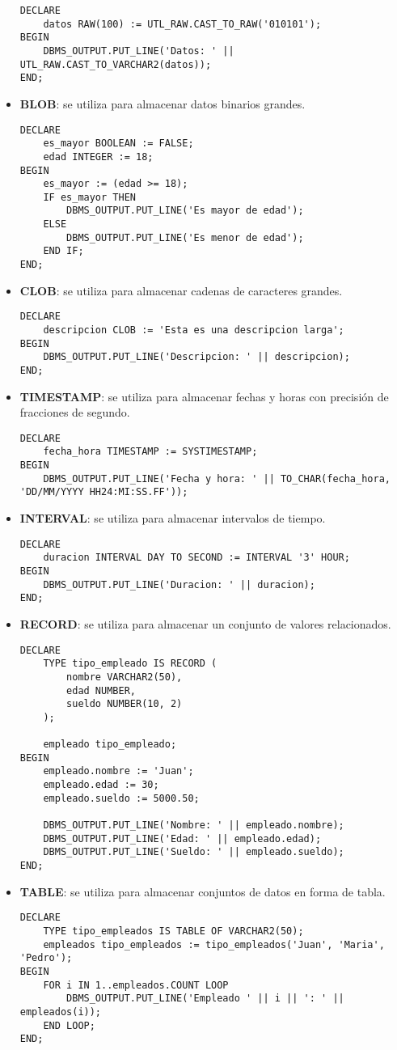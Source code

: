 \documentclass[executivepaper]{article}
\begin{document}
\begin{itemize}
\begin{lstlisting}
DECLARE
    datos RAW(100) := UTL_RAW.CAST_TO_RAW('010101');
BEGIN
    DBMS_OUTPUT.PUT_LINE('Datos: ' || UTL_RAW.CAST_TO_VARCHAR2(datos));
END;    
\end{lstlisting}
    \item \textbf{BLOB}: se utiliza para almacenar datos binarios grandes.
\begin{lstlisting}
DECLARE
    es_mayor BOOLEAN := FALSE;
    edad INTEGER := 18;
BEGIN
    es_mayor := (edad >= 18);
    IF es_mayor THEN
        DBMS_OUTPUT.PUT_LINE('Es mayor de edad');
    ELSE
        DBMS_OUTPUT.PUT_LINE('Es menor de edad');
    END IF;
END;
\end{lstlisting}
    \item \textbf{CLOB}: se utiliza para almacenar cadenas de caracteres grandes.
\begin{lstlisting}
DECLARE
    descripcion CLOB := 'Esta es una descripcion larga';
BEGIN
    DBMS_OUTPUT.PUT_LINE('Descripcion: ' || descripcion);
END;
\end{lstlisting}
    \item \textbf{TIMESTAMP}: se utiliza para almacenar fechas y horas con precisión de fracciones de segundo.
\begin{lstlisting}
DECLARE
    fecha_hora TIMESTAMP := SYSTIMESTAMP;
BEGIN
    DBMS_OUTPUT.PUT_LINE('Fecha y hora: ' || TO_CHAR(fecha_hora, 'DD/MM/YYYY HH24:MI:SS.FF'));
\end{lstlisting}
    \item \textbf{INTERVAL}: se utiliza para almacenar intervalos de tiempo.
\begin{lstlisting}
DECLARE
    duracion INTERVAL DAY TO SECOND := INTERVAL '3' HOUR;
BEGIN
    DBMS_OUTPUT.PUT_LINE('Duracion: ' || duracion);
END;
\end{lstlisting}
    \item \textbf{RECORD}: se utiliza para almacenar un conjunto de valores relacionados.
\begin{lstlisting}
DECLARE
    TYPE tipo_empleado IS RECORD (
        nombre VARCHAR2(50),
        edad NUMBER,
        sueldo NUMBER(10, 2)
    );

    empleado tipo_empleado;
BEGIN
    empleado.nombre := 'Juan';
    empleado.edad := 30;
    empleado.sueldo := 5000.50;

    DBMS_OUTPUT.PUT_LINE('Nombre: ' || empleado.nombre);
    DBMS_OUTPUT.PUT_LINE('Edad: ' || empleado.edad);
    DBMS_OUTPUT.PUT_LINE('Sueldo: ' || empleado.sueldo);
END;
\end{lstlisting}
    \item \textbf{TABLE}: se utiliza para almacenar conjuntos de datos en forma de tabla.
\begin{lstlisting}
DECLARE
    TYPE tipo_empleados IS TABLE OF VARCHAR2(50);
    empleados tipo_empleados := tipo_empleados('Juan', 'Maria', 'Pedro');
BEGIN
    FOR i IN 1..empleados.COUNT LOOP
        DBMS_OUTPUT.PUT_LINE('Empleado ' || i || ': ' || empleados(i));
    END LOOP;
END;
\end{lstlisting}
\end{itemize}
\end{document}
